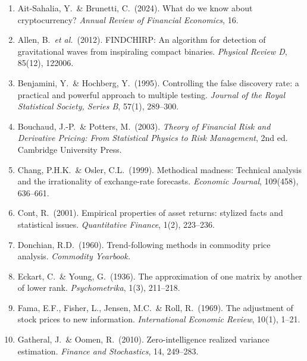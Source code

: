 \documentclass[11pt,a4paper]{article}
\theoremstyle{definition}
\theoremstyle{plain}
\begin{document}
\begin{enumerate}
    \item Ait-Sahalia, Y.\ \& Brunetti, C.\ (2024). What do we know about
          cryptocurrency? \textit{Annual Review of Financial Economics}, 16.

    \item Allen, B.\ \emph{et al.}\ (2012). FINDCHIRP: An algorithm for
          detection of gravitational waves from inspiraling compact binaries.
          \textit{Physical Review D}, 85(12), 122006.

    \item Benjamini, Y.\ \& Hochberg, Y.\ (1995). Controlling the false
          discovery rate: a practical and powerful approach to multiple
          testing. \textit{Journal of the Royal Statistical Society,
          Series B}, 57(1), 289--300.

    \item Bouchaud, J.-P.\ \& Potters, M.\ (2003). \textit{Theory of
          Financial Risk and Derivative Pricing: From Statistical Physics
          to Risk Management}, 2nd ed. Cambridge University Press.

    \item Chang, P.H.K.\ \& Osler, C.L.\ (1999). Methodical madness:
          Technical analysis and the irrationality of exchange-rate
          forecasts. \textit{Economic Journal}, 109(458), 636--661.

    \item Cont, R.\ (2001). Empirical properties of asset returns:
          stylized facts and statistical issues. \textit{Quantitative
          Finance}, 1(2), 223--236.

    \item Donchian, R.D.\ (1960). Trend-following methods in commodity
          price analysis. \textit{Commodity Yearbook.}

    \item Eckart, C.\ \& Young, G.\ (1936). The approximation of one
          matrix by another of lower rank. \textit{Psychometrika}, 1(3),
          211--218.

    \item Fama, E.F., Fisher, L., Jensen, M.C.\ \& Roll, R.\ (1969). The
          adjustment of stock prices to new information. \textit{International
          Economic Review}, 10(1), 1--21.

    \item Gatheral, J.\ \& Oomen, R.\ (2010). Zero-intelligence realized
          variance estimation. \textit{Finance and Stochastics}, 14,
          249--283.


\end{enumerate}
\end{document}
